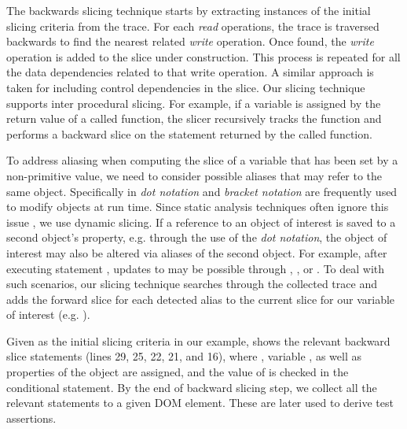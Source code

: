 The backwards slicing technique starts by extracting instances of the initial slicing criteria from the trace. For each \textit{read} operations, the trace is traversed backwards to find the nearest related \textit{write} operation. Once found, the \textit{write} operation is added to the slice under construction. This process is repeated for all the data dependencies related to that write operation. A similar approach is taken for including control dependencies in the slice. 
Our slicing technique supports inter procedural slicing. For example, if a variable is assigned by the return value of a called function, the slicer recursively tracks the function and performs a backward slice on the statement returned by the called function.
  
To address aliasing when computing the slice of a variable that has been set by a non-primitive value, we need to consider possible aliases that may refer to the same object. Specifically in \javascript \textit{dot notation} and \textit{bracket notation} are frequently used to modify objects at run time. Since static analysis techniques often ignore this issue \cite{Feldthaus:icse13}, we use dynamic slicing. If a reference to an object of interest is saved to a second object's property, e.g. through the use of the \textit{dot notation}, the object of interest may also be altered via aliases of the second object. For example, after executing statement , updates to  may be possible through , , or . To deal with such scenarios, our slicing technique searches through the collected trace and adds the forward slice for each detected alias to the current slice for our variable of interest (e.g. ). 

Given  as the initial slicing criteria in our example,  shows the relevant backward slice statements (lines 29, 25, 22, 21, and 16), where ,  variable , as well as properties of the object  are assigned, and the value of  is checked in the conditional statement.
By the end of backward slicing step, we collect all the relevant statements to a given DOM element. These are later used to derive test assertions.    
